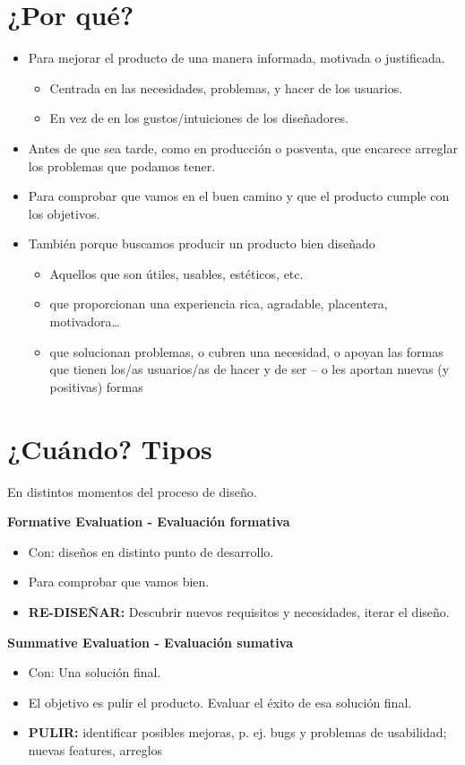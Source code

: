 \documentclass[12pt, twoside, openright]{report} %
\begin{document}
\section{¿Por qué?}
\begin{itemize}
  \item Para mejorar el producto de una manera informada, motivada o justificada.
  \begin{itemize}
    \item Centrada en las necesidades, problemas, y hacer de los usuarios.
    \item En vez de en los gustos/intuiciones de los diseñadores.
  \end{itemize}
  \item Antes de que sea tarde, como en producción o posventa, que encarece arreglar los problemas que podamos tener.
  \item Para comprobar que vamos en el buen camino y que el producto cumple con los objetivos.
  \item También porque buscamos producir un producto bien diseñado
  \begin{itemize}
    \item Aquellos que son útiles, usables, estéticos, etc.
    \item que proporcionan una experiencia rica, agradable, placentera, motivadora\dots
    \item que solucionan problemas, o cubren una necesidad, o apoyan las formas que tienen los/as usuarios/as de hacer y de ser – o les aportan nuevas (y positivas) formas
  \end{itemize}
\end{itemize}

\section{¿Cuándo? Tipos}
En distintos momentos del proceso de diseño.

\pagebreak

\textbf{Formative Evaluation - Evaluación formativa}
\begin{itemize}
  \item Con: diseños en distinto punto de desarrollo.
  \item Para comprobar que vamos bien.
  \item \textbf{RE-DISEÑAR:} Descubrir nuevos requisitos y necesidades, iterar el diseño.
\end{itemize}

\textbf{Summative Evaluation - Evaluación sumativa}
\begin{itemize}
  \item Con: Una solución final.
  \item El objetivo es pulir el producto. Evaluar el éxito de esa solución final.
  \item \textbf{PULIR:} identificar posibles mejoras, p. ej. bugs y problemas de usabilidad; nuevas features, arreglos
\end{itemize}
  
\end{document}

